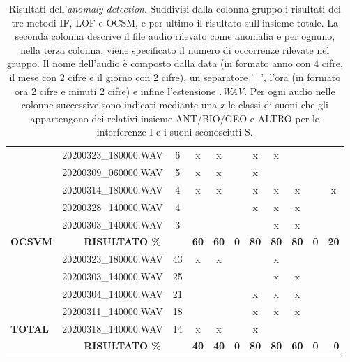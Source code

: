 \begin{table}[ht]
\begin{tabular}{@{}llccccccccc@{}}
		& 20200323\_180000.WAV & 6 & x & x &  & x & x &  &  &  \\
		& 20200309\_060000.WAV & 5 & x & x &  & x &  &  &  &  \\
		& 20200314\_180000.WAV & 4 & x & x &  & x & x & x &  & x \\
		& 20200328\_140000.WAV & 4 &  &  &  & x & x & x &  &  \\
		& 20200303\_140000.WAV & 3 &  &  &  &  & x & x &  &  \\ \cmidrule(l){2-11} 
		\multirow{-6}{*}{\textbf{OCSVM}} & \multicolumn{2}{c}{\cellcolor[HTML]{EFEFEF}\textbf{RISULTATO \%}} & \multicolumn{1}{c}{\cellcolor[HTML]{EFEFEF}\textbf{60}} & \multicolumn{1}{c}{\cellcolor[HTML]{EFEFEF}\textbf{60}} & \multicolumn{1}{c}{\cellcolor[HTML]{EFEFEF}\textbf{0}} & \multicolumn{1}{c}{\cellcolor[HTML]{EFEFEF}\textbf{80}} & \multicolumn{1}{c}{\cellcolor[HTML]{EFEFEF}\textbf{80}} & \multicolumn{1}{c}{\cellcolor[HTML]{EFEFEF}\textbf{80}} & \multicolumn{1}{c}{\cellcolor[HTML]{EFEFEF}\textbf{0}} & \multicolumn{1}{c}{\cellcolor[HTML]{EFEFEF}\textbf{20}} \\ \midrule
		& 20200323\_180000.WAV & 43 & x & x &  &  & x &  &  &  \\
		& 20200303\_140000.WAV & 25 & &  &  &  & x & x &  &  \\
		& 20200304\_140000.WAV & 21 &  &  &  & x & x & x &  &  \\
		& 20200311\_140000.WAV & 18 &  &  &  & x & x & x &  &  \\
		\multirow{-5}{*}{\textbf{TOTAL}} & 20200318\_140000.WAV & 14 & x & x &  & x &  &  &  &  \\ \midrule
		& \multicolumn{2}{c}{\cellcolor[HTML]{EFEFEF}\textbf{RISULTATO \%}} & \multicolumn{1}{c}{\cellcolor[HTML]{EFEFEF}\textbf{40}} & \multicolumn{1}{c}{\cellcolor[HTML]{EFEFEF}\textbf{40}} & \multicolumn{1}{c}{\cellcolor[HTML]{EFEFEF}\textbf{0}} & \multicolumn{1}{c}{\cellcolor[HTML]{EFEFEF}\textbf{80}} & \multicolumn{1}{c}{\cellcolor[HTML]{EFEFEF}\textbf{80}} & \multicolumn{1}{c}{\cellcolor[HTML]{EFEFEF}\textbf{60}} & \multicolumn{1}{r}{\cellcolor[HTML]{EFEFEF}\textbf{0}} & \multicolumn{1}{r}{\cellcolor[HTML]{EFEFEF}\textbf{0}} \\ \bottomrule
	\end{tabular}
	\caption{Risultati dell'\textit{anomaly detection}. Suddivisi dalla colonna gruppo i risultati dei tre metodi IF, LOF e OCSM, e per ultimo il risultato sull'insieme totale. La seconda colonna descrive il file audio rilevato come anomalia e per ognuno, nella terza colonna, viene specificato il numero di occorrenze rilevate nel gruppo. Il nome dell'audio è composto dalla data (in formato anno con 4 cifre, il mese con 2 cifre e il giorno con 2 cifre), un separatore '\textit{\_}', l'ora (in formato ora 2 cifre e minuti 2 cifre) e infine l'estensione \textit{.WAV}.  Per ogni audio nelle colonne successive sono indicati mediante una \textit{x} le classi di suoni che gli appartengono dei relativi insieme ANT/BIO/GEO e ALTRO per le interferenze I e i suoni sconosciuti S. }
	\label{fig:51}
\end{table}